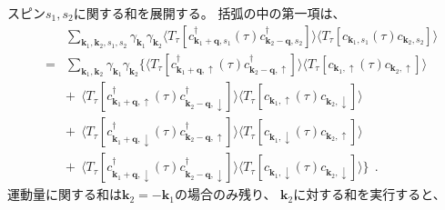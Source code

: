 \documentclass[a4j]{jsarticle}
\begin{document}
スピン$s_{1},s_{2}$に関する和を展開する。
括弧の中の第一項は、
%
%
%
%
\begin{eqnarray}
	&&
	\sum_{\bm{k}_{1} , \bm{k}_{2} , s_{1} ,s_{2} }
	\gamma_{\bm{k}_{1}}
	\gamma_{\bm{k}_{2}}
	\langle T_{\tau} [
			c_{ \bm{k}_{1}+\bm{q} , s_{1} }^{\dagger} (\tau)
			c_{ \bm{k}_{2}-\bm{q} , s_{2} }^{\dagger}
		] \rangle
	\langle T_{\tau} [
			c_{ \bm{k}_{1} , s_{1} } (\tau)
			c_{ \bm{k}_{2} , s_{2} }
		] \rangle
	\\ &=&
	\sum_{\bm{k}_{1} , \bm{k}_{2} }
	\gamma_{\bm{k}_{1}}
	\gamma_{\bm{k}_{2}}
	\Big\{
	\langle T_{\tau} [
			c_{ \bm{k}_{1}+\bm{q} , \uparrow }^{\dagger} (\tau)
			c_{ \bm{k}_{2}-\bm{q} , \uparrow }^{\dagger}
		] \rangle
	\langle T_{\tau} [
			c_{ \bm{k}_{1} , \uparrow } (\tau)
			c_{ \bm{k}_{2} , \uparrow }
		] \rangle
	\nonumber \\ && + \ \
	\langle T_{\tau} [
			c_{ \bm{k}_{1}+\bm{q} , \uparrow }^{\dagger} (\tau)
			c_{ \bm{k}_{2}-\bm{q} , \downarrow }^{\dagger}
		] \rangle
	\langle T_{\tau} [
			c_{ \bm{k}_{1} , \uparrow } (\tau)
			c_{ \bm{k}_{2} , \downarrow }
		] \rangle
	\nonumber \\[2mm] && + \ \
	\langle T_{\tau} [
			c_{ \bm{k}_{1}+\bm{q} , \downarrow }^{\dagger} (\tau)
			c_{ \bm{k}_{2}-\bm{q} , \uparrow }^{\dagger}
		] \rangle
	\langle T_{\tau} [
			c_{ \bm{k}_{1} , \downarrow } (\tau)
			c_{ \bm{k}_{2} , \uparrow }
		] \rangle
	\nonumber \\[2mm] && + \ \
	\langle T_{\tau} [
			c_{ \bm{k}_{1}+\bm{q} , \downarrow }^{\dagger} (\tau)
			c_{ \bm{k}_{2}-\bm{q} , \downarrow }^{\dagger}
		] \rangle
	\langle T_{\tau} [
			c_{ \bm{k}_{1} , \downarrow } (\tau)
			c_{ \bm{k}_{2} , \downarrow }
		] \rangle
	\Big\}
	\ \ .
\end{eqnarray}
%
%
%
%
運動量に関する和は$\bm{k}_{2}=-\bm{k}_{1}$の場合のみ残り、
$\bm{k}_{2}$に対する和を実行すると、
%
%
%
%
\end{document}
